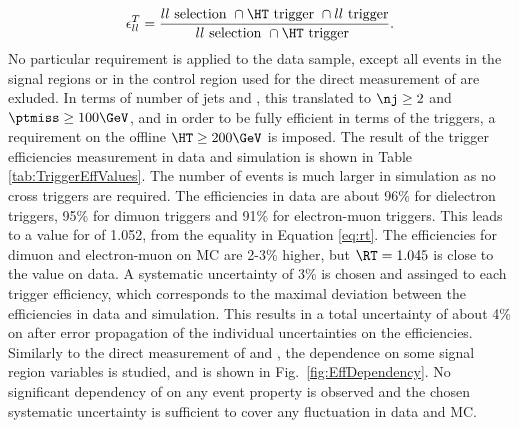 \begin{equation}
\epsilon_{ll}^{T} =\frac{ll\text{ selection }\cap \HT \text{ trigger } \cap ll\text{ trigger}  }{ ll\text{ selection }\cap \HT \text{ trigger }} .
\label{eq:rt}
\end{equation} 
No particular requirement is applied to the data sample, except all events in the signal regions or in the \ttbar control region used for the direct measurement of \Rsfof are exluded. 
In terms of number of jets and \ptmiss, this translated to $\nj\geq2$ and $\ptmiss\geq100\GeV$, and in order to be fully efficient in terms of the \HT triggers, a requirement on the offline $\HT\geq200\GeV$ is imposed.  
The result of the trigger efficiencies measurement in data and simulation is shown in Table \ref{tab:TriggerEffValues}. 
The number of events is much larger in simulation as no \HT cross triggers are required.
The efficiencies in data are about 96\% for dielectron triggers, 95\% for dimuon triggers and 91\% for electron-muon triggers. 
This leads to a value for \RT of 1.052, from the equality in Equation \ref{eq:rt}. 
The efficiencies for dimuon and electron-muon on MC are 2-3\% higher, but $\RT=1.045$ is close to the value on data.
A systematic uncertainty of 3\% is chosen and assinged to each trigger efficiency, which corresponds to the maximal deviation between the efficiencies in data and simulation.
This results in a total uncertainty of about 4\% on \RT after error propagation of the individual uncertainties on the efficiencies.
Similarly to the direct measurement of \Rsfof and \rmue, the dependence on some signal region variables is studied, and is shown in Fig.~\ref{fig:EffDependency}. 
No significant dependency of \RT on any event property is observed and the chosen systematic uncertainty is sufficient to cover any fluctuation in data and MC. 


